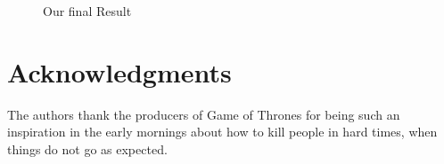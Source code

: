 \documentclass[10pt,conference,compsocconf]{IEEEtran}
\begin{document}
\begin{figure}[bp!]
	\hspace{0.025\linewidth}
	\caption{Our final Result}
	\label{fig:final_result}
\end{figure}

\section*{Acknowledgments}
The authors thank the producers of Game of Thrones for being such an inspiration in the early mornings about how to kill people in hard times, when things do not go as expected.



\end{document}
